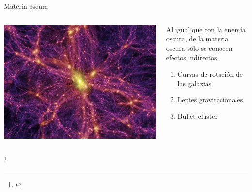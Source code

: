 \documentclass[handout]{beamer}
\newcommand\blfootnote[1]
{%
	\begingroup
	\renewcommand\thefootnote{}\footnote{#1}%
	\addtocounter{footnote}{-1}%
	\endgroup
}
\newcommand{\fcite}[1]{\blfootnote{\cite{#1}}}
\begin{document}
\begin{frame}{Materia oscura}
	\begin{columns}
		\begin{column}{0.5\textwidth}
			\includegraphics[width = \linewidth]{sources/images/natgeo.jpg}
		\end{column}
		\begin{column}{0.5\textwidth}
			Al igual que con la energía oscura, de la materia oscura sólo se conocen efectos indirectos.
			\begin{enumerate}
				\item Curvas de rotación de las galaxias
				\item Lentes gravitacionales
				\item Bullet cluster
			\end{enumerate}
		\end{column}
	\end{columns}
	\fcite{navarro1996structure}
\end{frame}
\end{document}
